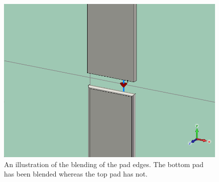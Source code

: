 \begin{figure}
	\centering
	\includegraphics[scale=.5]{Figures/blending4}
	\caption{An illustration of the blending of the pad edges. The bottom pad has been blended whereas the top pad has not.}
	\label{fig:blending4}
\end{figure}

